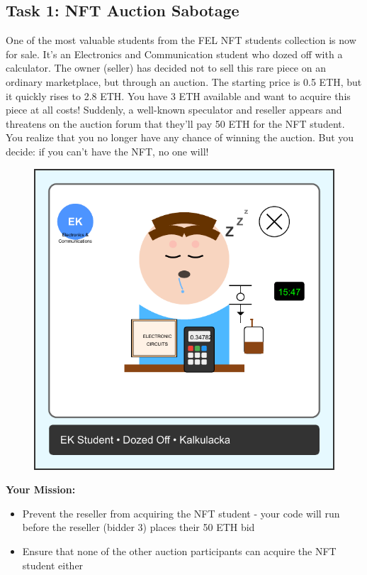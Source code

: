 \documentclass[12pt]{article}
\begin{document}
\subsection*{Task 1: NFT Auction Sabotage}

One of the most valuable students from the FEL NFT students collection is now for sale. It's an Electronics and Communication student who dozed off with a calculator. The owner (seller) has decided not to sell this rare piece on an ordinary marketplace, but through an auction. The starting price is 0.5 ETH, but it quickly rises to 2.8 ETH. You have 3 ETH available and want to acquire this piece at all costs! Suddenly, a well-known speculator and reseller appears and threatens on the auction forum that they'll pay 50 ETH for the NFT student. You realize that you no longer have any chance of winning the auction. But you decide: if you can't have the NFT, no one will!

\begin{figure}[h!]
  \centering
  \begin{minipage}{0.3\textwidth}
    \includegraphics[width=\textwidth]{NFTs/ek-student-nft.pdf}
  \end{minipage}
\end{figure}

\medskip
\noindent
\textbf{Your Mission:}
\begin{itemize}
    \item Prevent the reseller from acquiring the NFT student - your code will run before the reseller (bidder 3) places their 50 ETH bid
    \item Ensure that none of the other auction participants can acquire the NFT student either
\end{itemize}
\end{document}
